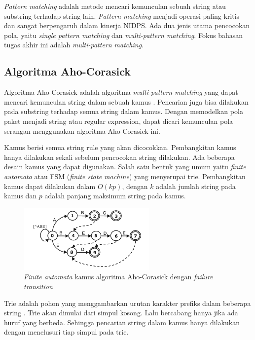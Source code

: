   \emph{Pattern matching} adalah metode mencari kemunculan sebuah string atau substring terhadap string lain. \emph{Pattern matching} menjadi operasi paling kritis dan sangat berpengaruh dalam kinerja NIDPS. Ada dua jenis utama pencocokan pola, yaitu \emph{single pattern matching} dan \emph{multi-pattern matching}. Fokus bahasan tugas akhir ini adalah \emph{multi-pattern matching}.

  \subsection{Algoritma Aho-Corasick}

    Algoritma Aho-Corasick adalah algoritma \emph{multi-pattern matching} yang dapat mencari kemunculan string dalam sebuah kamus \parencite{ahoc1975}. Pencarian juga bisa dilakukan pada substring terhadap semua string dalam kamus. Dengan memodelkan pola paket menjadi string atau regular expression, dapat dicari kemunculan pola serangan menggunakan algoritma Aho-Corasick ini.

    Kamus berisi semua string rule yang akan dicocokkan. Pembangkitan kamus hanya dilakukan sekali sebelum pencocokan string dilakukan. Ada beberapa desain kamus yang dapat digunakan. Salah satu bentuk yang umum yaitu \emph{finite automata} atau FSM (\emph{finite state machine}) yang menyerupai trie. Pembangkitan kamus dapat dilakukan dalam $O(kp)$, dengan $k$ adalah jumlah string pada kamus dan $p$ adalah panjang maksimum string pada kamus.

    \begin{figure}[H]
      \centering
      \includegraphics[width=0.6\textwidth]{resources/aho-c.png}
      \caption{\emph{Finite automata} kamus algoritma Aho-Corasick dengan \emph{failure transition} \parencite{lin2013}}
    \end{figure}

    Trie adalah pohon yang menggambarkan urutan karakter prefiks dalam beberapa string \parencite{trie59}. Trie akan dimulai dari simpul kosong. Lalu bercabang hanya jika ada huruf yang berbeda. Sehingga pencarian string dalam kamus hanya dilakukan dengan menelusuri tiap simpul pada trie. 

